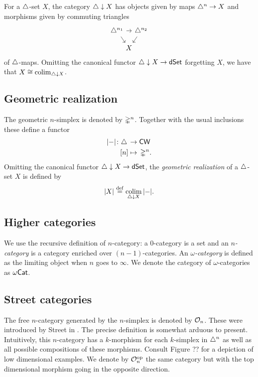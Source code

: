 For a $\triangle$-set $X$, the category $\triangle \downarrow X$ has objects given by maps $\triangle^n \to X$ and morphisms given by commuting triangles
\[
\begin{tikzcd}[column sep=-5pt, row sep=small]
	\simplex^{n_1} \arrow[dr] \arrow[rr] & & \simplex^{n_2}  \arrow[dl] \\
	& X &
\end{tikzcd}
\]
of $\triangle$-maps.
Omitting the canonical functor $\triangle \downarrow X \to \mathsf{dSet}$ forgetting $X$, we have that $X \cong \operatorname*{colim}_{\triangle \downarrow X}$.

\subsection{Geometric realization}

The geometric $n$-simplex is denoted by $\mathbb{\Delta}^n$.
Together with the usual inclusions these define a functor
\[
\begin{split}
	\lvert-\rvert \colon \triangle \, &\to \mathsf{CW} \\
	[n] &\mapsto \, \mathbb{\Delta}^n.
\end{split}
\]
Omitting the canonical functor $\triangle \downarrow X \to \mathsf{dSet}$, the \textit{geometric realization} of a $\triangle$-set $X$ is defined by
\[
\lvert X\rvert \stackrel{\mathrm{def}}{=} \operatorname*{colim}_{\triangle \downarrow X} \,\lvert-\rvert.
\]

\subsection{Higher categories}

We use the recursive definition of $n$-category: a $0$-category is a set and an \textit{$n$-category} is a category enriched over $(n-1)$-categories.
An \textit{\mbox{$\omega$-category}} is defined as the limiting object when $n$ goes to $\infty$.
We denote the category of $\omega$-categories as $\omega\mathsf{Cat}$.

\subsection{Street categories}

The free $n$-category generated by the $n$-simplex is denoted by $\mathcal{O}_n$.
These were introduced by Street in \cite{street1987orientals}.
The precise definition is somewhat arduous to present.
Intuitively, this $n$-category has a $k$-morphism for each $k$-simplex in $\triangle^n$ as well as all possible compositions of these morphisms.
Consult Figure ?? for a depiction of low dimensional examples.
We denote by $\mathcal{O}_n^{\mathrm{op}}$ the same category but with the top dimensional morphism going in the opposite direction.

